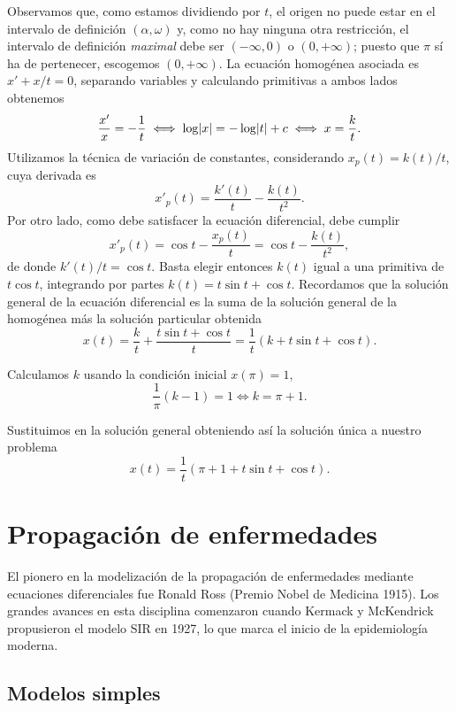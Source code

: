 \documentclass[../ecuaciones_diferenciales.tex]{subfiles}
\begin{document}
\begin{solution}
	Observamos que, como estamos dividiendo por \(t\), el origen no puede estar
    en el intervalo de definición \((\alpha, \omega)\) y, como no hay ninguna
    otra restricción, el intervalo de definición \emph{maximal} debe ser
    \((-\infty, 0)\) o \((0,+\infty)\); puesto que \(\pi\) sí ha de pertenecer,
    escogemos \((0, +\infty)\). La ecuación homogénea asociada es
    \(x' + x/t = 0\), separando variables y calculando primitivas a ambos lados
    obtenemos
	\[\frac{x'}{x} = -\frac{1}{t} \iff \log\abs{x}
		= -\log\abs{t} + c \iff x = \frac{k}{t}.\]
	Utilizamos la técnica de variación de constantes, considerando
	\(x_p(t) = k(t)/t\), cuya derivada es
	\[x'_p(t) = \frac{k'(t)}{t} - \frac{k(t)}{t^2}.\]
	Por otro lado, como debe satisfacer la ecuación diferencial, debe cumplir
	\[x'_p(t) = \cos t - \frac{x_p(t)}{t} = \cos t - \frac{k(t)}{t^2},\]
	de donde \(k'(t)/t = \cos t\). Basta elegir entonces \(k(t)\) igual a una
	primitiva de \(t \cos t\), integrando por partes
	\(k(t) = t \sin t + \cos t\). Recordamos que la solución general de la
	ecuación diferencial es la suma de la solución general de la homogénea más
	la solución particular obtenida
	\[x(t) = \frac{k}{t} + \frac{t \sin t + \cos t}{t}
		= \frac{1}{t}(k + t \sin t + \cos t).\]

	Calculamos \(k\) usando la condición inicial \(x(\pi) = 1\),
	\[\frac{1}{\pi}(k - 1) = 1 \iff k = \pi + 1.\]

	Sustituimos en la solución general obteniendo así la solución única a
	nuestro problema
	\[x(t) = \frac{1}{t}(\pi + 1 + t \sin t + \cos t).\]
\end{solution}

\section{Propagación de enfermedades}

El pionero en la modelización de la propagación de enfermedades mediante
ecuaciones diferenciales fue Ronald Ross (Premio Nobel de Medicina 1915). Los
grandes avances en esta disciplina comenzaron cuando Kermack y McKendrick
propusieron el modelo SIR en 1927, lo que marca el inicio de la
epidemiología moderna.

\subsection{Modelos simples}
\end{document}
